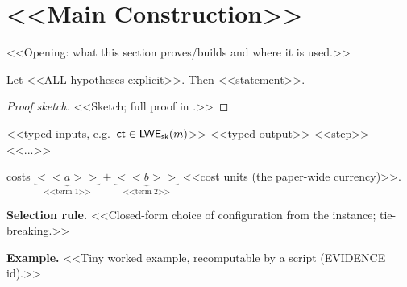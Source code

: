 \section{<<Main Construction>>}\label{sec:construction}
<<Opening: what this section proves/builds and where it is used.>>

\begin{theorem}[<<name>>]\label{thm:main}
Let <<ALL hypotheses explicit>>. Then <<statement>>.
\end{theorem}
\begin{proof}[Proof sketch]
<<Sketch; full proof in .>>
\end{proof}

\begin{algorithm}[t]
\footnotesize
\caption{\textsf{<<Name>>} --- <<one-line purpose>>}\label{alg:main}
\begin{algorithmic}[1]
\Require <<typed inputs, e.g.\ $\mathsf{ct}\in\mathsf{LWE}_{\mathsf{sk}}(m)$>>
\Ensure <<typed output>>
\State <<step>> 
\State \Return <<...>>
\end{algorithmic}
\end{algorithm}

\begin{proposition}[Cost]\label{prop:cost}
 costs
$\underbrace{<<a>>}_{\text{<<term 1>>}}+\underbrace{<<b>>}_{\text{<<term 2>>}}$
<<cost units (the paper-wide currency)>>.
\end{proposition}

\noindent\textbf{Selection rule.} <<Closed-form choice of configuration from the instance; tie-breaking.>>

\noindent\textbf{Example.} <<Tiny worked example, recomputable by a script (EVIDENCE id).>>
